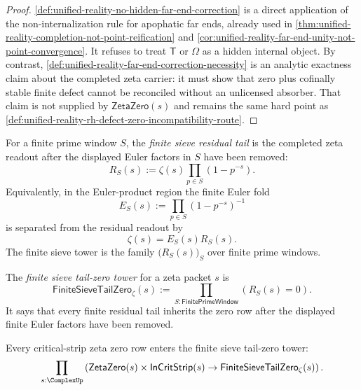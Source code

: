 \begin{proof}
\autoref{def:unified-reality-no-hidden-far-end-correction} is a direct
application of the non-internalization rule for apophatic far ends,
already used in
\autoref{thm:unified-reality-completion-not-point-reification} and
\autoref{cor:unified-reality-far-end-unity-not-point-convergence}.  It
refuses to treat $\mathsf{T}$ or $\Omega$ as a hidden internal object.
By contrast,
\autoref{def:unified-reality-far-end-correction-necessity} is an
analytic exactness claim about the completed zeta carrier: it must show
that zero plus cofinally stable finite defect cannot be reconciled
without an unlicensed absorber.  That claim is not supplied by
$\mathsf{ZetaZero}(s)$ and remains the same hard point as
\autoref{def:unified-reality-rh-defect-zero-incompatibility-route}.
\end{proof}

\begin{definition}
\label{def:unified-reality-finite-sieve-residual-tail}
For a finite prime window $S$, the \emph{finite sieve residual tail} is
the completed zeta readout after the displayed Euler factors in $S$ have
been removed:
$$
R_S(s)
:=
\zeta(s)\prod_{p\in S}(1-p^{-s}).
$$
Equivalently, in the Euler-product region the finite Euler fold
$$
E_S(s):=\prod_{p\in S}(1-p^{-s})^{-1}
$$
is separated from the residual readout by
$$
\zeta(s)=E_S(s)R_S(s).
$$
The finite sieve tower is the family $\bigl(R_S(s)\bigr)_S$ over finite
prime windows.
\end{definition}

\begin{definition}
\label{def:unified-reality-finite-sieve-tail-zero-tower}
The \emph{finite sieve tail-zero tower} for a zeta packet $s$ is
$$
\mathsf{FiniteSieveTailZero}_{\zeta}(s)
:=
\prod_{S:\mathsf{FinitePrimeWindow}}
\left(
R_S(s)=0
\right).
$$
It says that every finite residual tail inherits the zero row after the
displayed finite Euler factors have been removed.
\end{definition}

\begin{theorem}
\label{thm:unified-reality-zero-rows-enter-finite-sieve-tails}
Every critical-strip zeta zero row enters the finite sieve tail-zero
tower:
$$
\prod_{s:\ComplexUp}
\left(
\mathsf{ZetaZero}(s)
\times
\mathsf{InCritStrip}(s)
\to
\mathsf{FiniteSieveTailZero}_{\zeta}(s)
\right).
$$
\end{theorem}

